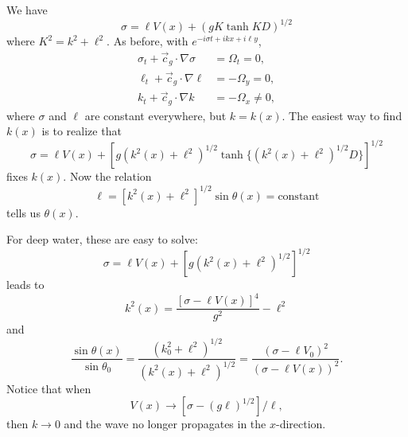 \sourcepagebreak


We have
\[
	\sigma=\ell V(x)+(gK\tanh KD)^{1/2}
\]
where $K^2=k^2+\ell^2$. As before, with $e^{-i\sigma t+ikx+i\ell y}$,
\begin{align*}
	\sigma_t+\vec c_g\cdot\nabla\sigma & =\Omega_t=0,    \\
	\ell_t+\vec c_g\cdot\nabla\ell     & =-\Omega_y=0,   \\
	k_t+\vec c_g\cdot\nabla k          & =-\Omega_x\ne0,
\end{align*}
where $\sigma$ and $\ell$ are constant everywhere, but $k=k(x)$. The easiest way to find $k(x)$ is
to realize that
\[
	\sigma=\ell V(x)+[g(k^2(x)+\ell^2)^{1/2}\tanh\{(k^2(x)+\ell^2)^{1/2}D\}]^{1/2}
\]
fixes $k(x)$. Now the relation
\[
	\ell=[k^2(x)+\ell^2]^{1/2}\sin\theta(x)=\text{constant}
\]
tells us $\theta(x)$.

For deep water, these are easy to solve:
\[
	\sigma=\ell V(x)+[g(k^2(x)+\ell^2)^{1/2}]^{1/2}
\]
leads to
\[
	k^2(x)=\frac{[\sigma-\ell V(x)]^4}{g^2}-\ell^2
\]
and
\[
	\frac{\sin\theta(x)}{\sin\theta_0}
	=\frac{(k_0^2+\ell^2)^{1/2}}{(k^2(x)+\ell^2)^{1/2}}
	=\frac{(\sigma-\ell V_0)^2}{(\sigma-\ell V(x))^2}.
\]
Notice that when
\[
	V(x)\to[\sigma-(g\ell)^{1/2}]/\ell,
\]
then $k\to0$ and the wave no longer propagates in the $x$-direction.
